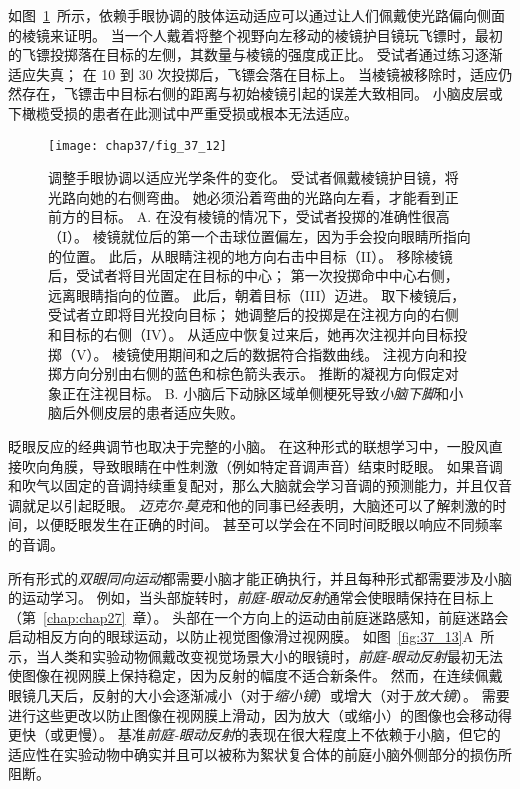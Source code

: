 如图~\ref{fig:37_12}~所示，依赖手眼协调的肢体运动适应可以通过让人们佩戴使光路偏向侧面的棱镜来证明。
当一个人戴着将整个视野向左移动的棱镜护目镜玩飞镖时，最初的飞镖投掷落在目标的左侧，其数量与棱镜的强度成正比。
受试者通过练习逐渐适应失真；
在 10 到 30 次投掷后，飞镖会落在目标上。
当棱镜被移除时，适应仍然存在，飞镖击中目标右侧的距离与初始棱镜引起的误差大致相同。
小脑皮层或下橄榄受损的患者在此测试中严重受损或根本无法适应。


\begin{figure}[htbp]
	\centering
	\texttt{[image: chap37/fig\_37\_12]}
	\caption{调整手眼协调以适应光学条件的变化。
		受试者佩戴棱镜护目镜，将光路向她的右侧弯曲。
		她必须沿着弯曲的光路向左看，才能看到正前方的目标\cite{martin1996throwing}。
		A. 在没有棱镜的情况下，受试者投掷的准确性很高（I）。
		棱镜就位后的第一个击球位置偏左，因为手会投向眼睛所指向的位置。
		此后，从眼睛注视的地方向右击中目标（II）。
		移除棱镜后，受试者将目光固定在目标的中心；
		第一次投掷命中中心右侧，远离眼睛指向的位置。
		此后，朝着目标（III）迈进。
		取下棱镜后，受试者立即将目光投向目标；
		她调整后的投掷是在注视方向的右侧和目标的右侧（IV）。
		从适应中恢复过来后，她再次注视并向目标投掷（V）。
		棱镜使用期间和之后的数据符合指数曲线。
		注视方向和投掷方向分别由右侧的蓝色和棕色箭头表示。
		推断的凝视方向假定对象正在注视目标。
		B. 小脑后下动脉区域单侧梗死导致\textit{小脑下脚}和小脑后外侧皮层的患者适应失败。}
	\label{fig:37_12}
\end{figure}


眨眼反应的经典调节也取决于完整的小脑。
在这种形式的联想学习中，一股风直接吹向角膜，导致眼睛在中性刺激（例如特定音调声音）结束时眨眼。
如果音调和吹气以固定的音调持续重复配对，那么大脑就会学习音调的预测能力，并且仅音调就足以引起眨眼。
\textit{迈克尔$\cdot$莫克}和他的同事已经表明，大脑还可以了解刺激的时间，以便眨眼发生在正确的时间。
甚至可以学会在不同时间眨眼以响应不同频率的音调。


所有形式的\textit{双眼同向运动}都需要小脑才能正确执行，并且每种形式都需要涉及小脑的运动学习。
例如，当头部旋转时，\textit{前庭-眼动反射}通常会使眼睛保持在目标上（第~\ref{chap:chap27}~章）。
头部在一个方向上的运动由前庭迷路感知，前庭迷路会启动相反方向的眼球运动，以防止视觉图像滑过视网膜。
如图~\ref{fig:37_13}A~所示，当人类和实验动物佩戴改变视觉场景大小的眼镜时，\textit{前庭-眼动反射}最初无法使图像在视网膜上保持稳定，因为反射的幅度不适合新条件。
然而，在连续佩戴眼镜几天后，反射的大小会逐渐减小（对于\textit{缩小镜}）或增大（对于\textit{放大镜}）。
需要进行这些更改以防止图像在视网膜上滑动，因为放大（或缩小）的图像也会移动得更快（或更慢）。
基准\textit{前庭-眼动反射}的表现在很大程度上不依赖于小脑，但它的适应性在实验动物中确实并且可以被称为絮状复合体的前庭小脑外侧部分的损伤所阻断。


